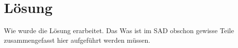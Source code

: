 \chapter{Lösung}

Wie wurde die Lösung erarbeitet. Das Was ist im SAD obschon gewisse Teile zusammengefasst hier aufgeführt werden müssen.